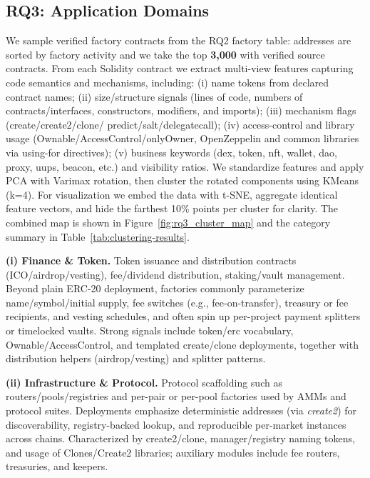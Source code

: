 \documentclass[acmsmall, screen]{acmart}
\begin{document}
	\subsection{RQ3: Application Domains}
	We sample verified factory contracts from the RQ2 factory table: addresses are sorted by factory
	activity and we take the top \textbf{3,000} with verified source contracts. From each Solidity contract
	we extract multi-view features capturing code semantics and mechanisms, including: (i) name tokens
	from declared contract names; (ii) size/structure signals (lines of code, numbers of contracts/interfaces,
	constructors, modifiers, and imports); (iii) mechanism flags (create/create2/clone/ predict/salt/delegatecall);
	(iv) access-control and library usage (Ownable/AccessControl/onlyOwner, OpenZeppelin and common libraries
	via using-for directives); (v) business keywords (dex, token, nft, wallet, dao, proxy, uups, beacon,
	etc.) and visibility ratios. We standardize features and apply PCA with Varimax rotation, then
	cluster the rotated components using KMeans (k=4). For visualization we embed the data with t-SNE,
	aggregate identical feature vectors, and hide the farthest 10\% points per cluster for clarity. The
	combined map is shown in Figure~\ref{fig:rq3_cluster_map} and the category summary in Table~\ref{tab:clustering-results}.

	

	\textbf{(i) Finance \& Token.} Token issuance and distribution contracts (ICO/airdrop/vesting),
	fee/dividend distribution, staking/vault management. Beyond plain ERC-20 deployment, factories commonly
	parameterize name/symbol/initial supply, fee switches (e.g., fee-on-transfer), treasury or fee recipients,
	and vesting schedules, and often spin up per-project payment splitters or timelocked vaults.
	Strong signals include token/erc vocabulary, Ownable/AccessControl, and templated create/clone
	deployments, together with distribution helpers (airdrop/vesting) and splitter patterns.

	\textbf{(ii) Infrastructure \& Protocol.} Protocol scaffolding such as routers/pools/registries
	and per-pair or per-pool factories used by AMMs and protocol suites. Deployments emphasize deterministic
	addresses (via \textit{create2}) for discoverability, registry-backed lookup, and reproducible
	per-market instances across chains. Characterized by create2/clone, manager/registry naming
	tokens, and usage of Clones/Create2 libraries; auxiliary modules include fee routers, treasuries,
	and keepers.
\end{document}
